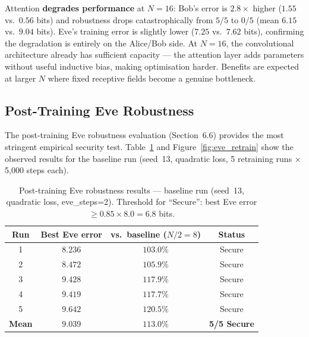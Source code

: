 \documentclass[12pt, a4paper]{article}
\begin{document}
Attention \textbf{degrades performance} at $N=16$: Bob's error is
$2.8\times$ higher ($1.55$ vs.\ $0.56$ bits) and robustness drops
catastrophically from $5/5$ to $0/5$ (mean $6.15$ vs.\ $9.04$ bits).
Eve's training error is slightly lower ($7.25$ vs.\ $7.62$ bits),
confirming the degradation is entirely on the Alice/Bob side.
At $N=16$, the convolutional architecture already has sufficient capacity
--- the attention layer adds parameters without useful inductive bias,
making optimisation harder. Benefits are expected at larger $N$ where
fixed receptive fields become a genuine bottleneck.
\subsection{Post-Training Eve Robustness}
\label{subsec:robustness_results_sec10}

The post-training Eve robustness evaluation (Section~6.6) provides the
most stringent empirical security test. Table~\ref{tab:robustness_results}
and Figure~\ref{fig:eve_retrain} show the observed results for the
baseline run (seed~13, quadratic loss, 5 retraining runs $\times$
5{,}000 steps each).

\begin{table}[H]
  \centering
  \caption{Post-training Eve robustness results --- baseline run
           (seed~13, quadratic loss, eve\_steps=2).
           Threshold for ``Secure'': best Eve error
           $\geq 0.85 \times 8.0 = 6.8$ bits.}
  \label{tab:robustness_results}
  \renewcommand{\arraystretch}{1.35}
  \begin{tabular}{@{} c c c c @{}}
    \toprule
    \textbf{Run} & \textbf{Best Eve error} &
    \textbf{vs.\ baseline ($N/2=8$)} & \textbf{Status} \\
    \midrule
    1 & $8.236$ & $103.0\%$ & \textcolor{GreenOK}{Secure} \\
    2 & $8.472$ & $105.9\%$ & \textcolor{GreenOK}{Secure} \\
    3 & $9.428$ & $117.9\%$ & \textcolor{GreenOK}{Secure} \\
    4 & $9.419$ & $117.7\%$ & \textcolor{GreenOK}{Secure} \\
    5 & $9.642$ & $120.5\%$ & \textcolor{GreenOK}{Secure} \\
    \midrule
    \textbf{Mean} & $\mathbf{9.039}$ & $\mathbf{113.0\%}$ &
    \textbf{5/5 Secure} \\
    \bottomrule
  \end{tabular}
\end{table}
\end{document}
